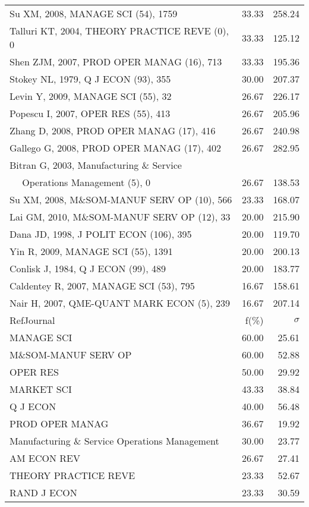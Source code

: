 \documentclass[a4paper,11pt]{report}
\begin{document}
\begin{landscape}
\begin{table}[!ht]
{\begin{tabular}{|l r r|}
Su XM, 2008, MANAGE SCI (54), 1759 & 33.33 & 258.24\\
Talluri KT, 2004, THEORY PRACTICE REVE (0), 0 & 33.33 & 125.12\\
Shen ZJM, 2007, PROD OPER MANAG (16), 713 & 33.33 & 195.36\\
Stokey NL, 1979, Q J ECON (93), 355 & 30.00 & 207.37\\
Levin Y, 2009, MANAGE SCI (55), 32 & 26.67 & 226.17\\
Popescu I, 2007, OPER RES (55), 413 & 26.67 & 205.96\\
Zhang D, 2008, PROD OPER MANAG (17), 416 & 26.67 & 240.98\\
Gallego G, 2008, PROD OPER MANAG (17), 402 & 26.67 & 282.95\\
Bitran G, 2003, Manufacturing \& Service &  & \\
$\quad$ Operations Management (5), 0 & 26.67 & 138.53\\
Su XM, 2008, M\&SOM-MANUF SERV OP (10), 566 & 23.33 & 168.07\\
Lai GM, 2010, M\&SOM-MANUF SERV OP (12), 33 & 20.00 & 215.90\\
Dana JD, 1998, J POLIT ECON (106), 395 & 20.00 & 119.70\\
Yin R, 2009, MANAGE SCI (55), 1391 & 20.00 & 200.13\\
Conlisk J, 1984, Q J ECON (99), 489 & 20.00 & 183.77\\
Caldentey R, 2007, MANAGE SCI (53), 795 & 16.67 & 158.61\\
Nair H, 2007, QME-QUANT MARK ECON (5), 239 & 16.67 & 207.14\\
\hline
\hline
RefJournal & f(\%) & $\sigma$\\
\hline
MANAGE SCI & 60.00 & 25.61\\
M\&SOM-MANUF SERV OP & 60.00 & 52.88\\
OPER RES & 50.00 & 29.92\\
MARKET SCI & 43.33 & 38.84\\
Q J ECON & 40.00 & 56.48\\
PROD OPER MANAG & 36.67 & 19.92\\
Manufacturing \& Service Operations Management & 30.00 & 23.77\\
AM ECON REV & 26.67 & 27.41\\
THEORY PRACTICE REVE & 23.33 & 52.67\\
RAND J ECON & 23.33 & 30.59\\
\hline
\end{tabular}
}
\end{table}

\end{landscape}
\end{document}
